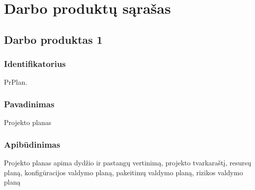 \section{Darbo produktų sąrašas}

\subsection{Darbo produktas 1}

\subsubsection{Identifikatorius}

PrPlan.

\subsubsection{Pavadinimas}

Projekto planas

\subsubsection{Apibūdinimas}
 
Projekto planas apima dydžio ir pastangų vertinimą, projekto
tvarkaraštį, resursų planą, konfigūracijos valdymo planą,
pakeitimų valdymo planą, rizikos valdymo planą